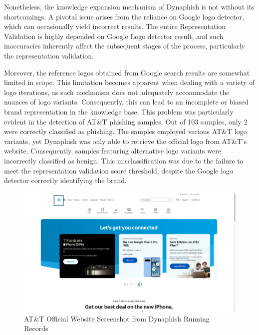 Nonetheless, the knowledge expansion mechanism of Dynaphish is not without its shortcomings. A pivotal issue arises from the reliance on Google logo detector, which can occasionally yield incorrect results. The entire Representation Validation is highly depended on Google Logo detector result, and such inaccuracies inherently affect the subsequent stages of the process, particularly the representation validation. 

Moreover, the reference logos obtained from Google search results are somewhat limited in scope. This limitation becomes apparent when dealing with a variety of logo iterations, as such mechanism does not adequately accommodate the nuances of logo variants. Consequently, this can lead to an incomplete or biased brand representation in the knowledge base. This problem was particularly evident in the detection of AT\&T phishing samples. Out of 103 samples, only 2 were correctly classified as phishing. The samples employed various AT\&T logo variants, yet Dynaphish was only able to retrieve the official logo from AT\&T's website. Consequently, samples featuring alternative logo variants were incorrectly classified as benign. This misclassification was due to the failure to meet the representation validation score threshold, despite the Google logo detector correctly identifying the brand.

\begin{figure}[H]
\caption{AT\&T Official Website Screenshot from Dynaphish Running Records}
\centering
\includegraphics[width=1\textwidth]{images/at_t.png}
\end{figure}

